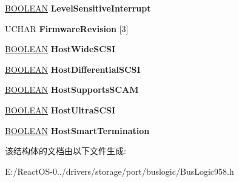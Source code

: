 \begin{DoxyCompactItemize}
\hyperlink{_processor_bind_8h_a112e3146cb38b6ee95e64d85842e380a}{B\+O\+O\+L\+E\+AN} {\bfseries Level\+Sensitive\+Interrupt}
\item 
\mbox{\label{struct_bus_logic___wmi_extended_setup_information_a3eeb3fc741788634495f16b0ff811298}} 
U\+C\+H\+AR {\bfseries Firmware\+Revision} \mbox{[}3\mbox{]}
\item 
\mbox{\label{struct_bus_logic___wmi_extended_setup_information_a75f144f20690a58aab57757002daf94a}} 
\hyperlink{_processor_bind_8h_a112e3146cb38b6ee95e64d85842e380a}{B\+O\+O\+L\+E\+AN} {\bfseries Host\+Wide\+S\+C\+SI}
\item 
\mbox{\label{struct_bus_logic___wmi_extended_setup_information_a078195574e3f50488b06a6243d0f8e0f}} 
\hyperlink{_processor_bind_8h_a112e3146cb38b6ee95e64d85842e380a}{B\+O\+O\+L\+E\+AN} {\bfseries Host\+Differential\+S\+C\+SI}
\item 
\mbox{\label{struct_bus_logic___wmi_extended_setup_information_ae9aa15ad5941efdc7368c81c8cd22d2c}} 
\hyperlink{_processor_bind_8h_a112e3146cb38b6ee95e64d85842e380a}{B\+O\+O\+L\+E\+AN} {\bfseries Host\+Supports\+S\+C\+AM}
\item 
\mbox{\label{struct_bus_logic___wmi_extended_setup_information_ae8ed8f1ff1b4fab4c40a88585131aa05}} 
\hyperlink{_processor_bind_8h_a112e3146cb38b6ee95e64d85842e380a}{B\+O\+O\+L\+E\+AN} {\bfseries Host\+Ultra\+S\+C\+SI}
\item 
\mbox{\label{struct_bus_logic___wmi_extended_setup_information_a34a9c95aa4cd20703840e846c4904e81}} 
\hyperlink{_processor_bind_8h_a112e3146cb38b6ee95e64d85842e380a}{B\+O\+O\+L\+E\+AN} {\bfseries Host\+Smart\+Termination}
\end{DoxyCompactItemize}


该结构体的文档由以下文件生成\+:\begin{DoxyCompactItemize}
\item 
E\+:/\+React\+O\+S-\/0../drivers/storage/port/buslogic/Bus\+Logic958.\+h\end{DoxyCompactItemize}

